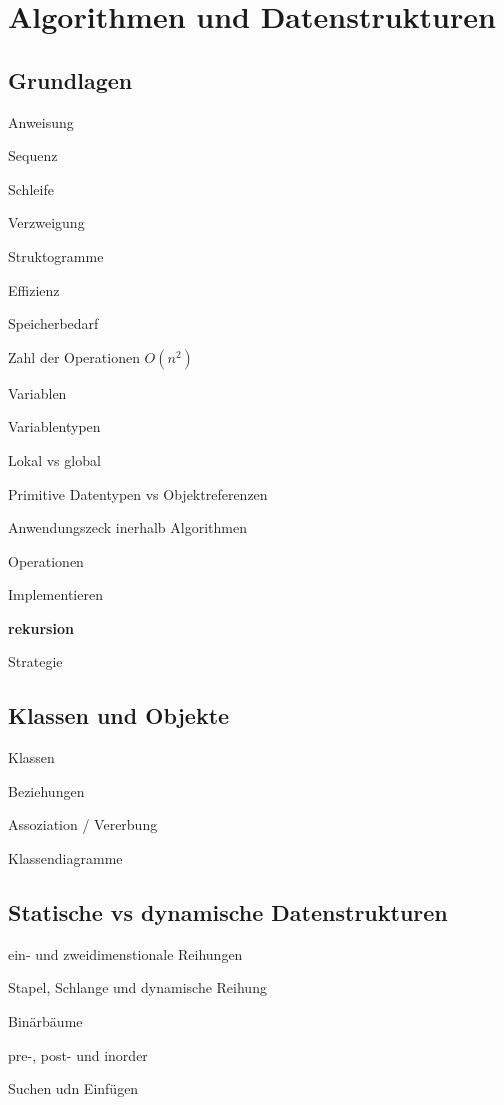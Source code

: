 \chapter{Algorithmen und Datenstrukturen}

\section{Grundlagen}

\startitemize[packed]
\item Anweisung
\item Sequenz
\item Schleife
\item Verzweigung
\item Struktogramme
\item Effizienz
\startitemize[packed]
\item Speicherbedarf
\item Zahl der Operationen $O(n^2)$
\stopitemize
\item Variablen
\startitemize[packed]
\item Variablentypen
\item Lokal vs global
\item Primitive Datentypen vs Objektreferenzen
\item Anwendungszeck inerhalb Algorithmen
\stopitemize
\item Operationen 
\item Implementieren
\startitemize[packed]
\item {\bf rekursion}
\item Strategie 
\stopitemize
\stopitemize

\section{Klassen und Objekte}

\startitemize[packed]
\item Klassen
\item Beziehungen
\item Assoziation / Vererbung
\item Klassendiagramme
\stopitemize

\section{Statische vs dynamische Datenstrukturen}

\startitemize[packed]
\item ein- und zweidimenstionale Reihungen
\item Stapel, Schlange und dynamische Reihung
\item Binärbäume
\startitemize[packed]
\item pre-, post- und inorder
\item Suchen udn Einfügen
\stopitemize
\stopitemize

